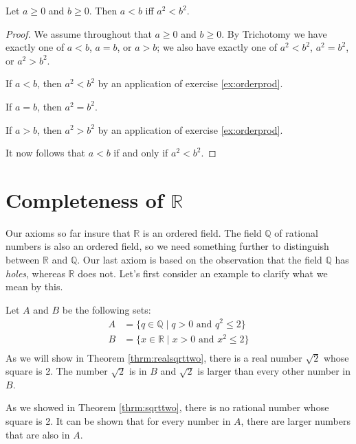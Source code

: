 \begin{thrm} \label{thrm:ordersquares}
Let $a\geq 0$ and $b\geq 0$. Then $a<b$ iff $a^2<b^2$.
\end{thrm}

\begin{proof}
We assume throughout that $a\geq0$ and $b\geq0$. By Trichotomy we have exactly one of $a<b$, $a=b$, or $a>b$; we also have exactly one of $a^2<b^2$, $a^2=b^2$, or $a^2>b^2$.

If $a<b$, then $a^2<b^2$ by an application of exercise \ref{ex:orderprod}.

If $a=b$, then $a^2=b^2$.

If $a>b$, then $a^2>b^2$ by an application of exercise \ref{ex:orderprod}.

It now follows that $a<b$ if and only if $a^2<b^2$.
\end{proof}

\section{Completeness of $\mathbb R$}

Our axioms so far insure that $\mathbb R$ is an ordered field.  The field $\mathbb Q$ of rational numbers is also an ordered field, so we need something further to distinguish between $\mathbb R$ and $\mathbb Q$. Our last axiom is based on the observation that the field $\mathbb Q$ has \emph{holes}, whereas $\mathbb R$ does not. Let's first consider an example to clarify what we mean by this.

\begin{example}
Let $A$ and $B$ be the following sets:
\begin{equation*}
\begin{split}
A&=\{ q\in\mathbb Q \mid q>0 \text{ and }q^2\leq 2 \}\\
B&=\{ x\in\mathbb R \mid x>0 \text{ and } x^2\leq 2 \}\\
\end{split}
\end{equation*}
As we will show in Theorem \ref{thrm:realsqrttwo}, there is a real number $\sqrt 2$ whose square is 2. The number $\sqrt 2$ is in $B$ and $\sqrt 2$ is larger than every other number in $B$.

As we showed in Theorem \ref{thrm:sqrttwo}, there is no rational number whose square is 2. It can be shown that for every number in $A$, there are larger numbers that are also in $A$.
\end{example}

